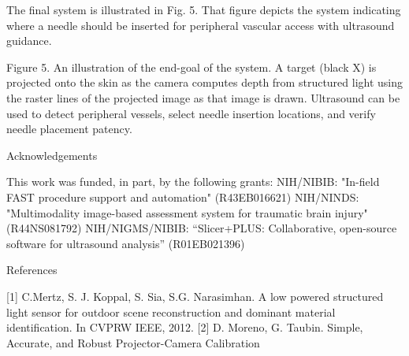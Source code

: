 \documentclass{llncs}
\begin{document}
The final system is illustrated in Fig. 5.  That figure depicts the system indicating where a needle should be inserted for peripheral vascular access with ultrasound guidance.


Figure 5. An illustration of the end-goal of the system.  A target (black X) is projected onto the skin as the camera computes depth from structured light using the raster lines of the projected image as that image is drawn.  Ultrasound can be used to detect peripheral vessels, select needle insertion locations, and verify needle placement patency.


Acknowledgements

This work was funded, in part, by the following grants:
NIH/NIBIB: "In-field FAST procedure support and automation" (R43EB016621)
NIH/NINDS: "Multimodality image-based assessment system for traumatic brain injury" (R44NS081792)
NIH/NIGMS/NIBIB: “Slicer+PLUS: Collaborative, open-source software for ultrasound analysis” (R01EB021396)

References

[1] C.Mertz, S. J. Koppal, S. Sia, S.G. Narasimhan. A low powered structured light sensor for 
     outdoor scene reconstruction and dominant material identification. In CVPRW IEEE, 2012.
[2] D. Moreno, G. Taubin. Simple, Accurate, and Robust Projector-Camera Calibration
\end{document}
